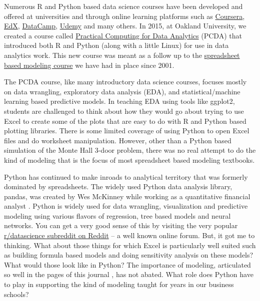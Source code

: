 \documentclass[ited,blindrev]{informs3}              %
\begin{document}
Numerous R and Python based data science courses have been developed and offered at universities and through online learning platforms such as \href{https://www.coursera.org/browse/data-science}{Coursera}, \href{https://www.edx.org/learn/data-science}{EdX}, \href{https://www.datacamp.com/}{DataCamp}, \href{https://www.udemy.com/topic/data-analysis/}{Udemy} and many others. In 2015, at Oakland University, we created a course called \href{http://www.sba.oakland.edu/faculty/isken/courses/mis5470/}{Practical Computing for Data Analytics} (PCDA) that introduced both R and Python (along with a little Linux) for use in data analytics work. This new course was meant as a follow up to the \href{http://www.sba.oakland.edu/faculty/isken/courses/mis5460/}{spreadsheet based modeling course} we have had in place since 2001.

The PCDA course, like many introductory data science courses, focuses mostly on data wrangling, exploratory data analysis (EDA), and statistical/machine learning based predictive models. In teaching EDA using tools like ggplot2, students are challenged to think about how they would go about trying to use Excel to create some of the plots that are easy to do with R and Python based plotting libraries. There is some limited coverage of using Python to open Excel files and do worksheet manipulation. However, other than a Python based simulation of the Monte Hall 3-door problem, there was no real attempt to do the kind of modeling that is the focus of most spreadsheet based modeling textbooks. 

Python has continued to make inroads to analytical territory that was formerly dominated by spreadsheets. The widely used Python data analysis library, pandas, was created by Wes McKinney while working as a quantitative financial analyst \cite{mckinney2022python}. Python is widely used for data wrangling, visualization and predictive modeling using various flavors of regression, tree based models and neural networks. You can get a very good sense of this by visiting the very popular \href{https://www.reddit.com/r/datascience/}{r/datascience subreddit on Reddit} -- a well known online forum. But, it got me to thinking. What about those things for which Excel is particularly well suited such as building formula based models and doing sensitivity analysis on these models? What would those look like in Python? The importance of modeling, articulated so well in the pages of this journal \cite{powellTeachingModelingManagement2001}, has not abated. What role does Python have to play in supporting the kind of modeling taught for years in our business schools?
\end{document}
